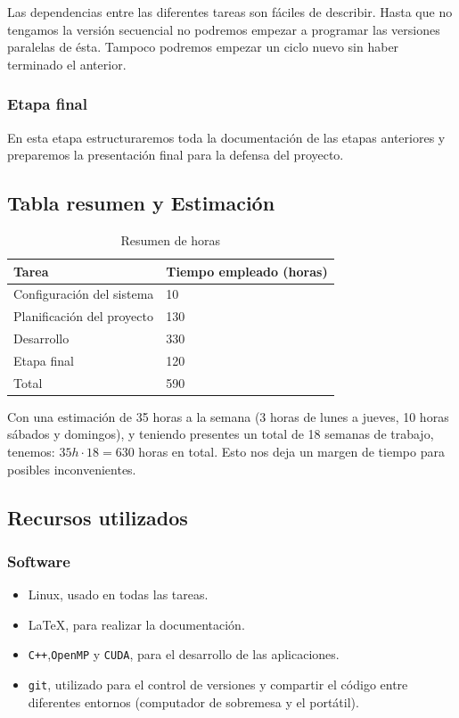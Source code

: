 \documentclass[titlepage,12pt]{report}
\begin{document}
Las dependencias entre las diferentes tareas son fáciles de describir. Hasta que no tengamos la versión secuencial no podremos empezar a programar las versiones paralelas de ésta. Tampoco podremos empezar un ciclo nuevo sin haber terminado el anterior.

\subsubsection{Etapa final}

En esta etapa estructuraremos toda la documentación de las etapas anteriores y preparemos la presentación final para la defensa del proyecto.

\subsection{Tabla resumen y Estimación}

\begin{table}[H]
	\centering
	\begin{tabular}{|m{5cm}||m{5cm}|}
		\hline
		Tarea & Tiempo empleado (horas) \\ \hline \hline
		Configuración del sistema & 10 \\ \hline
		Planificación del proyecto & 130 \\ \hline
		Desarrollo & 330 \\ \hline
		Etapa final & 120 \\ \hline \hline
		Total & 590 \\ \hline
	\end{tabular}
	\caption{Resumen de horas}
\end{table}

Con una estimación de 35 horas a la semana (3 horas de lunes a jueves, 10 horas sábados y domingos), y teniendo presentes un total de 18 semanas de trabajo, tenemos: $35h \cdot 18 = 630$ horas en total. Esto nos deja un margen de tiempo para posibles inconvenientes.

\subsection{Recursos utilizados}

\subsubsection{Software}

\begin{itemize}
	\item Linux, usado en todas las tareas.
	\item \LaTeX , para realizar la documentación.
	\item \texttt{C++},\texttt{OpenMP} y \texttt{CUDA}, para el desarrollo de las aplicaciones.
	\item \texttt{git}, utilizado para el control de versiones y compartir el código entre diferentes entornos (computador de sobremesa y el portátil).
\end{itemize}
\end{document}
